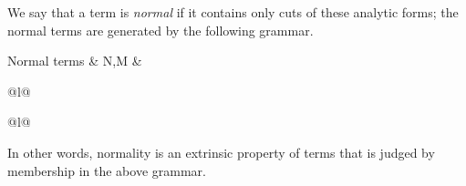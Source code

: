 We say that a term is \emph{normal} if it contains only cuts of these analytic forms;
the normal terms are generated by the following grammar.
\begin{syntax*}
  Normal terms &
    N,M & \begin{array}[t]{@{}l@{}}
            \fwd \mid {} \mid {} \\
            \begin{array}[t]{@{\mathllap{\mid {}}}l@{}}
              \selectR{\kay} \mid {} \\
               \mid \selectL{\kay}
            \end{array}
          \end{array}
\end{syntax*}
In other words, normality is an extrinsic property of terms that is judged by membership in the above grammar.

